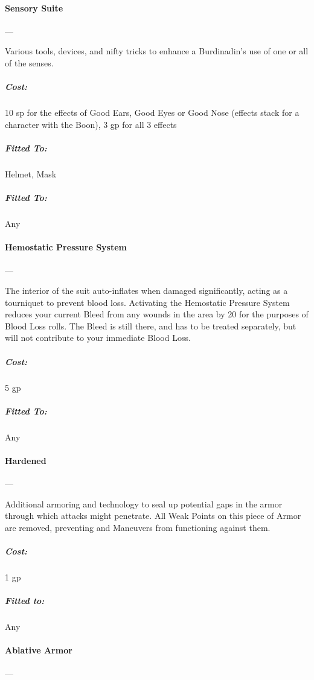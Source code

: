 \documentclass[oneside,11pt,english]{book}
\begin{document}
\paragraph{Sensory Suite}---

Various tools, devices, and nifty tricks to enhance a Burdinadin’s use of one or all of the senses. 
\vspace{-15pt}\subparagraph{Cost:} 10 sp for the effects of Good Ears, Good Eyes or Good Nose (effects stack for a character with the Boon), 3 gp for all 3 effects
\vspace{-15pt}\subparagraph{Fitted To:} Helmet, Mask
\vspace{-15pt}\subparagraph{Fitted To:} Any

\paragraph{Hemostatic Pressure System}---\quad[1]

The interior of the suit auto-inflates when damaged significantly, acting as a tourniquet to prevent blood 
loss. Activating the Hemostatic Pressure System reduces your current Bleed from any wounds in the area 
by 20 for the purposes of Blood Loss rolls. The Bleed is still there, and has to be treated separately, but
will not contribute to your immediate Blood Loss.
\vspace{-15pt}\subparagraph{Cost:} 5 gp
\vspace{-15pt}\subparagraph{Fitted To:} Any

\paragraph{Hardened}---\quad[1]

Additional armoring and technology to seal up potential gaps in the armor through which attacks might 
penetrate. All Weak Points on this piece of Armor are removed, preventing  and  Maneuvers from functioning against them. %
\vspace{-15pt}\subparagraph{Cost:} 1 gp
\vspace{-15pt}\subparagraph{Fitted to:} Any

\paragraph{Ablative Armor}---\quad[1]
\end{document}
